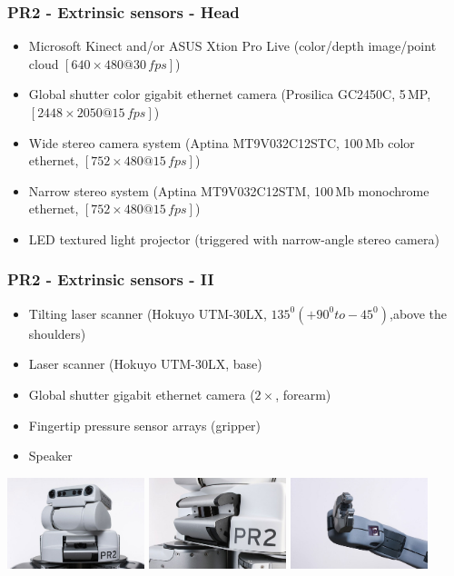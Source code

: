 \begin{frame}
  \frametitle{PR2 - Extrinsic sensors - Head}
\begin{itemize}
    \item Microsoft Kinect and/or ASUS Xtion Pro Live (color/depth image/point cloud $[640\times480 @ 30\,fps]$)
    \item Global shutter color gigabit ethernet camera (Prosilica GC2450C, 5\,MP, $[2448\times2050 @ 15\,fps]$)
    \item Wide stereo camera system (Aptina MT9V032C12STC, 100\,Mb color ethernet, $[752\times480@15\,fps]$)
    \item Narrow stereo system (Aptina MT9V032C12STM, 100\,Mb monochrome ethernet, $[752\times480@15\,fps]$)    
    \item LED textured light projector (triggered with narrow-angle stereo camera)
\end{itemize}
\end{frame}

\begin{frame}
  \frametitle{PR2 - Extrinsic sensors - II}
\begin{itemize}
    \item Tilting laser scanner (Hokuyo UTM-30LX, $135^0 (+90^0 to -45^0)$,above the shoulders)
    \item Laser scanner (Hokuyo UTM-30LX, base)
    \item Global shutter gigabit ethernet camera ($2\times$, forearm)
    \item Fingertip pressure sensor arrays (gripper)
    \item Speaker
\end{itemize}
\hspace{-4ex}
\includegraphics[width=4cm]{../images/head_tiltLRF.jpg} 
\includegraphics[width=4cm]{../images/tilted_lrf.jpg}
\includegraphics[width=4cm]{../images/pr2_hand_camera.jpg}  
\end{frame}

